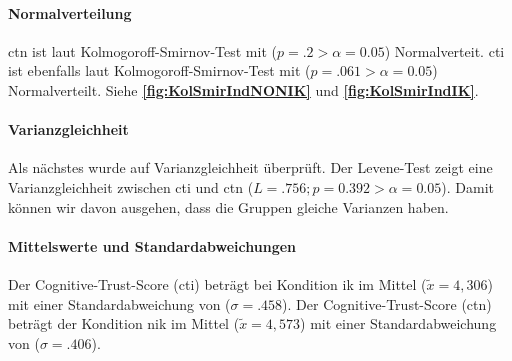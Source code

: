 \documentclass[a4paper,11pt]{article}%
\renewcommand{\\}{\vspace*{0.5\baselineskip} \newline}
\begin{document}
%
%	
\paragraph{Normalverteilung}
\ac{ctn} ist laut Kolmogoroff-Smirnov-Test mit ($p = .2 > \alpha = 0.05$) Normalverteit. \ac{cti} ist ebenfalls laut Kolmogoroff-Smirnov-Test mit ($p = .061 > \alpha = 0.05$) Normalverteilt. 
Siehe \textbf{\autoref{fig:KolSmirIndNONIK}} und \textbf{\autoref{fig:KolSmirIndIK}}.

\paragraph{Varianzgleichheit}
Als nächstes wurde auf Varianzgleichheit überprüft. Der Levene-Test zeigt eine Varianzgleichheit zwischen \ac{cti} und \ac{ctn} ($L = .756; p=0.392 > \alpha = 0.05$). Damit können wir davon ausgehen, dass die Gruppen gleiche Varianzen haben. 
\paragraph{Mittelswerte und Standardabweichungen}
Der Cognitive-Trust-Score (\ac{cti}) beträgt bei Kondition \ac{ik} im Mittel ($\tilde x = 4,306$) mit einer Standardabweichung von ($\sigma = .458$).\newline 
Der Cognitive-Trust-Score (\ac{ctn}) beträgt der Kondition \ac{nik} im Mittel ($\tilde x = 4,573$) mit einer Standardabweichung von ($\sigma = .406$).
\end{document}
